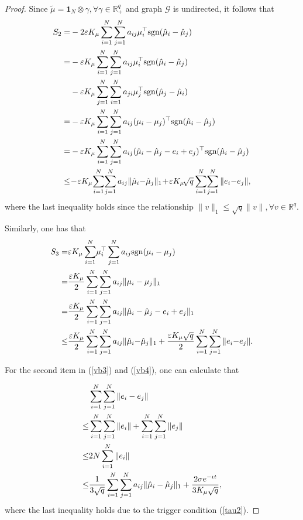 \documentclass[letterpaper, 10 pt, conference]{ieeeconf}  %
\newcommand{\sign}[1]{\mathrm{sgn}(#1)}
\begin{document}
\begin{proof}
	Since $\tilde{\mu}= \boldsymbol1_N \otimes \gamma, \forall \gamma\in \mathbb{R}_+^q$ and graph $\mathcal{G}$ is undirected, it follows that
	\begin{align}
		S_{2}=
		&-2\varepsilon K_\mu \sum_{i=1}^{N} \sum_{j=1}^N a_{ij}\mu_i^\top\sign{\hat\mu_i-\hat\mu_j}\notag\\
		=
		&-\varepsilon K_\mu \sum_{i=1}^{N}  \sum_{j=1}^N a_{ij}\mu_i^\top\sign{\hat\mu_i-\hat\mu_j}\notag\\
		&- \varepsilon K_\mu \sum_{j=1}^{N}  \sum_{i=1}^N a_{ji}\mu_j^\top\sign{\hat\mu_j-\hat\mu_i} \notag\\
		=
		&-\varepsilon K_\mu \sum_{i=1}^{N}  \sum_{j=1}^N a_{ij}(\mu_i-\mu_j)^\top \sign{\hat\mu_i-\hat\mu_j}\notag\\
		= 
		&-\varepsilon K_\mu \sum_{i=1}^{N}  \sum_{j=1}^N a_{ij} (\hat\mu_i-\hat\mu_j-e_i+e_j)^\top \sign{\hat\mu_i-\hat\mu_j}\notag\\
		\le
		& \!-\!\varepsilon K_\mu \!\sum_{i=1}^{N}\!\sum_{j=1}^N a_{ij} \|\hat\mu_i{-}\hat\mu_j\|_1 \!+\! \varepsilon K_\mu\!\sqrt{q} \sum_{i=1}^{N}  \!\sum_{j=1}^N \|e_i{-}e_j\|,	\label{vb3}
	\end{align}
	where the last inequality holds since the relationship  $\|v\|_1\le\sqrt{q}\|v\|, \forall v\in\mathbb{R}^q$.
	
	Similarly, one has that
	\begin{align}
		S_{3}
		= 
		&\varepsilon K_\mu \sum_{i=1}^{N} \!\mu_i^\top  \sum_{j=1}^N a_{ij}\sign{\mu_i-\mu_j}\notag\\
		=
		&\frac{\varepsilon K_\mu}{2} \sum_{i=1}^{N} \sum_{j=1}^N a_{ij}\|\mu_i-\mu_j\|_1\notag\\
		=
		&\frac{\varepsilon K_\mu}{2} \sum_{i=1}^{N} \sum_{j=1}^N a_{ij}\|\hat\mu_i-\hat\mu_j-e_i+e_j\|_1\notag\\	
		\le	
		&\frac{\varepsilon K_\mu}{2} \sum_{i=1}^{N} \sum_{j=1}^N a_{ij}\|\hat\mu_i{-}\hat\mu_j\|_1 + \frac{\varepsilon K_\mu\sqrt{q}}{2} \sum_{i=1}^{N} \sum_{j=1}^N \|e_i{-}e_j\|.\label{vb4}
	\end{align}

	For the second item in (\ref{vb3}) and (\ref{vb4}), one can calculate that

	\begin{align}
		&\sum_{i=1}^{N}  \sum_{j=1}^N  \|e_i-e_j\|\notag\\
		\le& \sum_{i=1}^{N}  \sum_{j=1}^N  \|e_i\| + \sum_{i=1}^{N}  \sum_{j=1}^N  \|e_j\|\notag\\
		\le &2N\sum_{i=1}^{N} \|e_i\|\notag\\
		\le &\frac{1}{3\sqrt{q}}\sum_{i=1}^{N} \sum_{j=1}^N a_{ij} \|\hat\mu_i-\hat\mu_j\|_1 + \frac{2\sigma e^{-\iota t}}{3K_\mu\sqrt{q}} ,	
	\end{align}
	where the last inequality holds due to the trigger condition (\ref{tau2}).
		

\end{proof}
\end{document}
